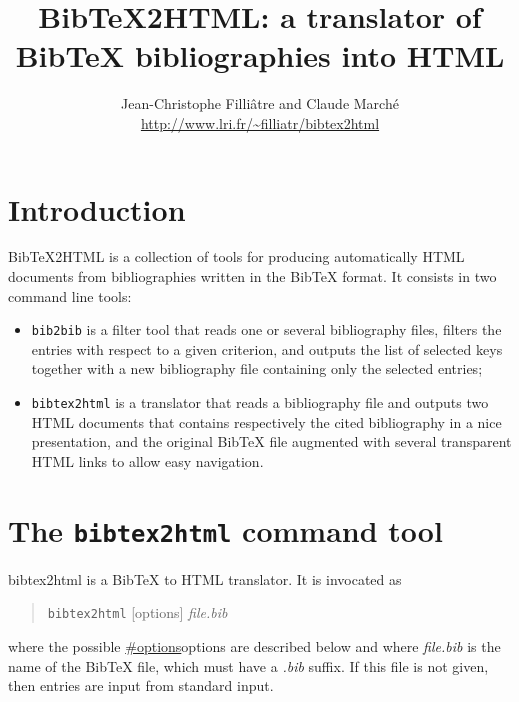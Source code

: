 \documentclass[11pt,a4paper]{article}
\newcommand{\monurl}[2]{\url{#1}}
\begin{document}
\title{BibTeX2HTML: a translator of BibTeX bibliographies into HTML}
\author{Jean-Christophe Filli\^{a}tre and Claude March\'e \\
        \normalsize\monurl{http://www.lri.fr/~filliatr/bibtex2html}{http://www.lri.fr/\~{}filliatr/bibtex2html}}
\date{}
\maketitle

\tableofcontents


\section{Introduction}

BibTeX2HTML is a collection of tools for producing automatically HTML
documents from bibliographies written in the BibTeX format. It
consists in two command line tools:
\begin{itemize}
\item \texttt{bib2bib} is a filter tool that reads one or several
  bibliography files, filters the entries with respect to a given
  criterion, and outputs the list of selected keys together with a new
  bibliography file containing only the selected entries;
\item \texttt{bibtex2html} is a translator that reads a bibliography
  file and outputs two HTML documents that contains respectively the
  cited bibliography in a nice presentation, and the original BibTeX
  file augmented with several transparent HTML links to allow easy
  navigation. 
\end{itemize}

\section{The \texttt{bibtex2html} command tool}

bibtex2html is a BibTeX to HTML translator. It is invocated as 
\begin{quote}
\texttt{bibtex2html} [options] \textit{file.bib}
\end{quote}
where the possible \url{#options}{options} are described below and
where \textit{file.bib} is the name of the BibTeX file, which must
have a \textit{.bib} suffix. If this file is not given, then entries
are input from standard input.
\end{document}
